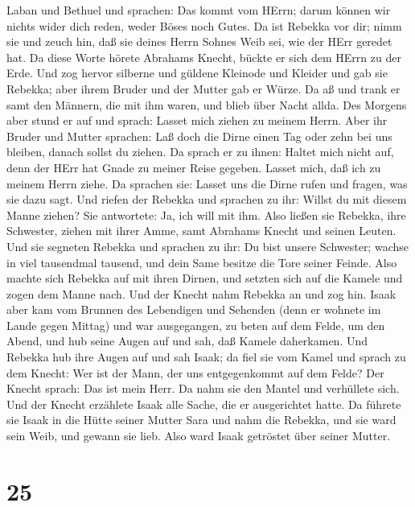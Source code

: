 Laban und Bethuel und sprachen: Das kommt vom HErrn; darum können wir
nichts wider dich reden, weder Böses noch Gutes.  Da ist
Rebekka vor dir; nimm sie und zeuch hin, daß sie deines Herrn Sohnes
Weib sei, wie der HErr geredet hat.  Da diese Worte hörete
Abrahams Knecht, bückte er sich dem HErrn zu der Erde.  Und
zog hervor silberne und güldene Kleinode und Kleider und gab sie
Rebekka; aber ihrem Bruder und der Mutter gab er Würze.  Da
aß und trank er samt den Männern, die mit ihm waren, und blieb über
Nacht allda. Des Morgens aber stund er auf und sprach: Lasset mich
ziehen zu meinem Herrn.  Aber ihr Bruder und Mutter
sprachen: Laß doch die Dirne einen Tag oder zehn bei uns bleiben, danach
sollst du ziehen.  Da sprach er zu ihnen: Haltet mich nicht
auf, denn der HErr hat Gnade zu meiner Reise gegeben. Lasset mich, daß
ich zu meinem Herrn ziehe.  Da sprachen sie: Lasset uns die
Dirne rufen und fragen, was sie dazu sagt.  Und riefen der
Rebekka und sprachen zu ihr: Willst du mit diesem Manne ziehen? Sie
antwortete: Ja, ich will mit ihm.  Also ließen sie Rebekka,
ihre Schwester, ziehen mit ihrer Amme, samt Abrahams Knecht und seinen
Leuten.  Und sie segneten Rebekka und sprachen zu ihr: Du
bist unsere Schwester; wachse in viel tausendmal tausend, und dein Same
besitze die Tore seiner Feinde.  Also machte sich Rebekka
auf mit ihren Dirnen, und setzten sich auf die Kamele und zogen dem
Manne nach. Und der Knecht nahm Rebekka an und zog hin. 
Isaak aber kam vom Brunnen des Lebendigen und Sehenden (denn er wohnete
im Lande gegen Mittag)  und war ausgegangen, zu beten auf
dem Felde, um den Abend, und hub seine Augen auf und sah, daß Kamele
daherkamen.  Und Rebekka hub ihre Augen auf und sah Isaak;
da fiel sie vom Kamel  und sprach zu dem Knecht: Wer ist
der Mann, der uns entgegenkommt auf dem Felde? Der Knecht sprach: Das
ist mein Herr. Da nahm sie den Mantel und verhüllete sich. 
Und der Knecht erzählete Isaak alle Sache, die er ausgerichtet hatte.
 Da führete sie Isaak in die Hütte seiner Mutter Sara und
nahm die Rebekka, und sie ward sein Weib, und gewann sie lieb. Also ward
Isaak getröstet über seiner Mutter.

\hypertarget{section-24}{%
\section{25}\label{section-24}}


